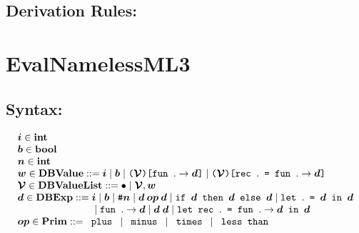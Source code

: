 \documentclass[11pt]{jarticle}
\begin{document}

\subsection*{Derivation Rules:}
\NamelessMLiiiDisplayRules

\newpage

\section*{EvalNamelessML3}



\subsection*{Syntax:}

\[\begin{array}{l}
\EvalNamelessMLiiiMV{i}[] \in \mathbf{int}\\
\EvalNamelessMLiiiMV{b}[] \in \mathbf{bool}\\
\EvalNamelessMLiiiMV{n}[] \in \mathbf{int}\\
\EvalNamelessMLiiiMV{v}[] \in \mathbf{DBValue} ::= \EvalNamelessMLiiiMV{i}[]
\mid \EvalNamelessMLiiiMV{b}[]
\mid \EvalNamelessMLiiiFunTerm{\EvalNamelessMLiiiMV{env}[]}
{\EvalNamelessMLiiiMV{d}[]}
\mid \EvalNamelessMLiiiRecTerm{\EvalNamelessMLiiiMV{env}[]}
{\EvalNamelessMLiiiMV{d}[]}\\
\EvalNamelessMLiiiMV{env}[] \in \mathbf{DBValueList} ::=
\EvalNamelessMLiiiEmptyTerm
\mid \EvalNamelessMLiiiBindTerm{\EvalNamelessMLiiiMV{env}[]}
{\EvalNamelessMLiiiMV{v}[]}\\
\EvalNamelessMLiiiMV{d}[] \in \mathbf{DBExp} ::= \EvalNamelessMLiiiMV{i}[]
\mid \EvalNamelessMLiiiMV{b}[]
\mid \EvalNamelessMLiiiIndexTerm{\EvalNamelessMLiiiMV{n}[]}
\mid \EvalNamelessMLiiiBinOpDTerm{\EvalNamelessMLiiiMV{op}[]}
{\EvalNamelessMLiiiMV{d}[]}{\EvalNamelessMLiiiMV{d}[]}
\mid \EvalNamelessMLiiiIfDTerm{\EvalNamelessMLiiiMV{d}[]}
{\EvalNamelessMLiiiMV{d}[]}{\EvalNamelessMLiiiMV{d}[]}
\mid \EvalNamelessMLiiiLetDTerm{\EvalNamelessMLiiiMV{d}[]}
{\EvalNamelessMLiiiMV{d}[]}
\\ \hspace*{2.7cm}
\mid \EvalNamelessMLiiiAbsDTerm{\EvalNamelessMLiiiMV{d}[]}
\mid \EvalNamelessMLiiiAppDTerm{\EvalNamelessMLiiiMV{d}[]}
{\EvalNamelessMLiiiMV{d}[]}
\mid \EvalNamelessMLiiiLetRecDTerm{\EvalNamelessMLiiiMV{d}[]}
{\EvalNamelessMLiiiMV{d}[]}\\
\EvalNamelessMLiiiMV{op}[] \in \mathbf{Prim} ::= \EvalNamelessMLiiiPlusTerm
\mid \EvalNamelessMLiiiMinusTerm \mid \EvalNamelessMLiiiMultTerm
\mid \EvalNamelessMLiiiLtTerm\\
\end{array}\]
\end{document}

